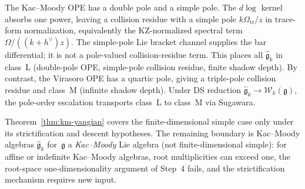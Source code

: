 \begin{remark}
\label{rem:km-pole-dichotomy}
The Kac--Moody OPE has a double pole and a simple pole.
The $d\log$ kernel absorbs one power, leaving a collision
residue with a simple pole $k\Omega_{\mathrm{tr}}/z$ in
trace-form normalization, equivalently the KZ-normalized spectral
term $\Omega/((k+h^\vee)z)$. The simple-pole Lie bracket channel
supplies the bar differential; it is not a pole-valued
collision-residue term. This
places all $\widehat{\mathfrak{g}}_k$ in class~L (double-pole
OPE, simple-pole collision residue, finite shadow depth).
By contrast, the Virasoro OPE has a quartic pole, giving
a triple-pole collision residue and class~M (infinite shadow
depth). Under DS reduction
$\widehat{\mathfrak{g}}_k\to\mathcal{W}_k(\mathfrak{g})$,
the pole-order escalation transports class~L to class~M
via Sugawara.
\end{remark}

\begin{remark}
\label{rem:km-frontier}
Theorem~\ref{thm:km-yangian} covers the finite-dimensional simple
case only under its strictification and descent hypotheses. The
remaining boundary is Kac--Moody algebras
$\widehat{\mathfrak{g}}_k$ for~$\mathfrak{g}$ a
\emph{Kac--Moody} Lie algebra (not finite-dimensional
simple): for affine or indefinite Kac--Moody algebras,
root multiplicities can exceed one, the root-space
one-dimensionality argument of Step~4 fails, and the
strictification mechanism requires new input.
\end{remark}

